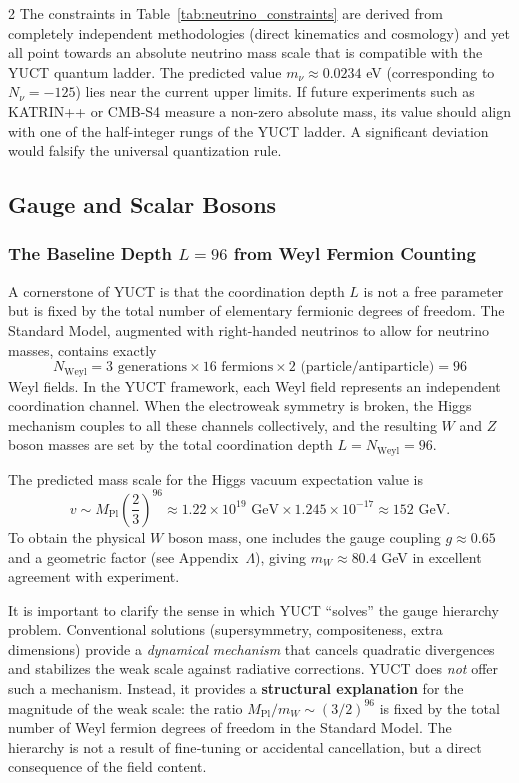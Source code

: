 \documentclass[11pt,a4paper]{article}
\begin{document}
\begin{multicols}{2}
		The constraints in Table~\ref{tab:neutrino_constraints} are derived from completely independent methodologies (direct kinematics and cosmology) and yet all point towards an absolute neutrino mass scale that is compatible with the YUCT quantum ladder. The predicted value $m_\nu \approx 0.0234$ eV (corresponding to $N_\nu = -125$) lies near the current upper limits. If future experiments such as KATRIN++ or CMB-S4 measure a non-zero absolute mass, its value should align with one of the half-integer rungs of the YUCT ladder. A significant deviation would falsify the universal quantization rule.
		
		\subsection{Gauge and Scalar Bosons}
		
		\subsubsection{The Baseline Depth $L=96$ from Weyl Fermion Counting}
		
		A cornerstone of YUCT is that the coordination depth $L$ is not a free parameter but is fixed by the total number of elementary fermionic degrees of freedom. The Standard Model, augmented with right-handed neutrinos to allow for neutrino masses, contains exactly
		\scriptsize
		\[
		N_{\text{Weyl}} = 3 \text{ generations} \times 16 \text{ fermions} \times 2 \text{ (particle/antiparticle)} = 96
		\]
		\small
		Weyl fields. In the YUCT framework, each Weyl field represents an independent coordination channel. When the electroweak symmetry is broken, the Higgs mechanism couples to all these channels collectively, and the resulting $W$ and $Z$ boson masses are set by the total coordination depth $L = N_{\text{Weyl}} = 96$.
		
		The predicted mass scale for the Higgs vacuum expectation value is
		\begin{equation}
			v \sim M_{\mathrm{Pl}} \left( \frac{2}{3} \right)^{96} \approx 1.22 \times 10^{19} \text{ GeV} \times 1.245\times10^{-17} \approx 152 \text{ GeV}.
		\end{equation}
		To obtain the physical $W$ boson mass, one includes the gauge coupling $g \approx 0.65$ and a geometric factor (see Appendix~$\Lambda$), giving $m_W \approx 80.4$ GeV in excellent agreement with experiment.
		
		It is important to clarify the sense in which YUCT ``solves'' the gauge hierarchy problem. Conventional solutions (supersymmetry, compositeness, extra dimensions) provide a \emph{dynamical mechanism} that cancels quadratic divergences and stabilizes the weak scale against radiative corrections. YUCT does \emph{not} offer such a mechanism. Instead, it provides a \textbf{structural explanation} for the magnitude of the weak scale: the ratio \(M_{\mathrm{Pl}}/m_W \sim (3/2)^{96}\) is fixed by the total number of Weyl fermion degrees of freedom in the Standard Model. The hierarchy is not a result of fine‑tuning or accidental cancellation, but a direct consequence of the field content.
		

\end{multicols}
\end{document}

